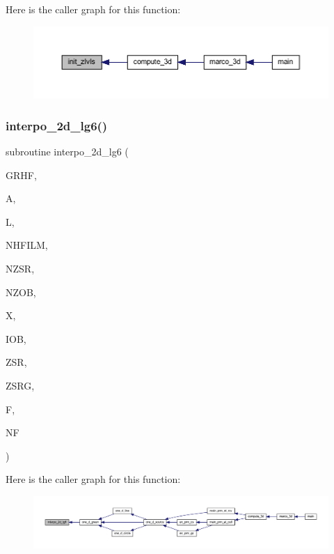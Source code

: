 Here is the caller graph for this function\+:
\nopagebreak
\begin{figure}[H]
\begin{center}
\leavevmode
\includegraphics[width=350pt]{Marco_8f90_a4052ce4c8e8ce6ad657a5430196fb520_icgraph}
\end{center}
\end{figure}
\mbox{\label{Marco_8f90_a170a0edeb8c14a416b4ec927bd0b5761}} 
\subsubsection{\texorpdfstring{interpo\+\_\+2d\+\_\+lg6()}{interpo\_2d\_lg6()}}
{\footnotesize\ttfamily subroutine interpo\+\_\+2d\+\_\+lg6 (\begin{DoxyParamCaption}\item[{complex, dimension(11,nhfilm,nzsr,nzob)}]{G\+R\+HF,  }\item[{real, dimension(l)}]{A,  }\item[{integer}]{L,  }\item[{integer}]{N\+H\+F\+I\+LM,  }\item[{integer}]{N\+Z\+SR,  }\item[{integer}]{N\+Z\+OB,  }\item[{real}]{X,  }\item[{integer}]{I\+OB,  }\item[{real}]{Z\+SR,  }\item[{real, dimension(2,nzsr)}]{Z\+S\+RG,  }\item[{complex, dimension(nf)}]{F,  }\item[{integer}]{NF }\end{DoxyParamCaption})}

Here is the caller graph for this function\+:
\nopagebreak
\begin{figure}[H]
\begin{center}
\leavevmode
\includegraphics[width=350pt]{Marco_8f90_a170a0edeb8c14a416b4ec927bd0b5761_icgraph}
\end{center}
\end{figure}
\mbox{\label{Marco_8f90_ab4eafb4c3c596148d85f446d1eb69d54}} 
